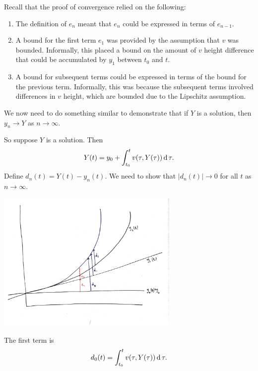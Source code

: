 Recall that the proof of convergence relied on the following:
\begin{enumerate}
\item The definition of $e_n$ meant that $e_n$ could be expressed in terms of $e_{n-1}$.
\item A bound for the first term $e_1$ was provided by the assumption that $v$
  was bounded. Informally, this placed a bound on the amount of $v$ height
  difference that could be accumulated by $y_1$ between $t_0$ and $t$.
\item A bound for subsequent terms could be expressed in terms of the bound for
  the previous term. Informally, this was because the subsequent terms involved
  differences in $v$ height, which are bounded due to the Lipschitz
  assumption.
\end{enumerate}

We now need to do something similar to demonstrate that if $Y$ is a solution,
then $y_n \to Y$ as $n \to \infty$.

So suppose $Y$ is a solution. Then
\begin{align*}
  Y(t) = y_0 + \int_{t_0}^t v(\tau, Y(\tau)) \operatorname{\text{d}}\tau.
\end{align*}
Define $d_n(t) = Y(t) - y_n(t)$. We need to show that $|d_n(t)| \to 0$ for all
$t$ as $n \to \infty$.\\

\begin{mdframed}
\includegraphics[width=250pt]{img/differential-equations-picard-convergence-uniqueness.png}
\end{mdframed}

The first term is
\begin{align*}
  d_0(t) = \int_{t_0}^t v(\tau, Y(\tau)) \operatorname{\text{d}}\tau.
\end{align*}

